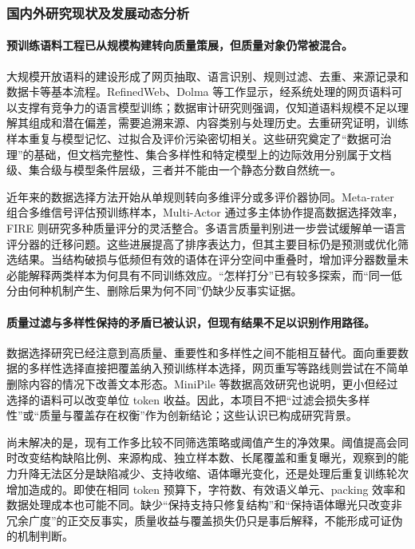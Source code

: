 \subsubsection{国内外研究现状及发展动态分析}

\paragraph{预训练语料工程已从规模构建转向质量策展，但质量对象仍常被混合。}

大规模开放语料的建设形成了网页抽取、语言识别、规则过滤、去重、来源记录和数据卡等基本流程。RefinedWeb、Dolma 等工作显示，经系统处理的网页语料可以支撑有竞争力的语言模型训练\cite{therefinedwebdataset2023,dolmaanopen2024}；数据审计研究则强调，仅知道语料规模不足以理解其组成和潜在偏差，需要追溯来源、内容类别与处理历史\cite{whatsin2023,anarchivalperspective2024}。去重研究证明，训练样本重复与模型记忆、过拟合及评价污染密切相关\cite{deduplicatingtrainingdata2022,quantifyingmemorizationacross2022}。这些研究奠定了“数据可治理”的基础，但文档完整性、集合多样性和特定模型上的边际效用分别属于文档级、集合级与模型条件层级，三者并不能由一个静态分数自然统一。

近年来的数据选择方法开始从单规则转向多维评分或多评价器协同。Meta-rater 组合多维信号评估预训练样本，Multi-Actor 通过多主体协作提高数据选择效率，FIRE 则研究多种质量评分的灵活整合\cite{zhuang2025metarater,bai2025multiactor,xu2025fire}。多语言质量判别进一步尝试缓解单一语言评分器的迁移问题\cite{ali2025jql}。这些进展提高了排序表达力，但其主要目标仍是预测或优化筛选结果。当结构破损与低频但有效的语体在评分空间中重叠时，增加评分器数量未必能解释两类样本为何具有不同训练效应。“怎样打分”已有较多探索，而“同一低分由何种机制产生、删除后果为何不同”仍缺少反事实证据。

\paragraph{质量过滤与多样性保持的矛盾已被认识，但现有结果不足以识别作用路径。}

数据选择研究已经注意到高质量、重要性和多样性之间不能相互替代。面向重要数据的多样性选择直接把覆盖纳入预训练样本选择\cite{harnessingdiversityfor2024}，网页重写等路线则尝试在不简单删除内容的情况下改善文本形态\cite{rephrasingtheweb2024}。MiniPile 等数据高效研究也说明，更小但经过选择的语料可以改变单位 token 收益\cite{theminipilechallenge2023}。因此，本项目不把“过滤会损失多样性”或“质量与覆盖存在权衡”作为创新结论；这些认识已构成研究背景。

尚未解决的是，现有工作多比较不同筛选策略或阈值产生的净效果。阈值提高会同时改变结构缺陷比例、来源构成、独立样本数、长尾覆盖和重复曝光，观察到的能力升降无法区分是缺陷减少、支持收缩、语体曝光变化，还是处理后重复训练轮次增加造成的。即使在相同 token 预算下，字符数、有效语义单元、packing 效率和数据处理成本也可能不同。缺少“保持支持只修复结构”和“保持语体曝光只改变非冗余广度”的正交反事实，质量收益与覆盖损失仍只是事后解释，不能形成可证伪的机制判断。

